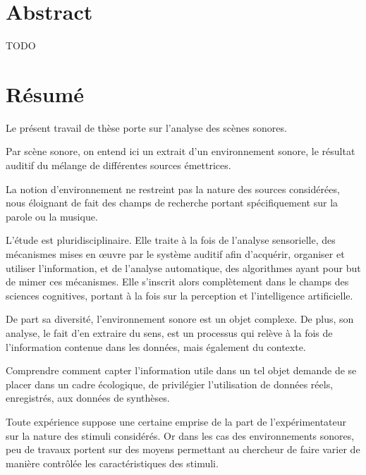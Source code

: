 \begingroup
\let\clearpage\relax
\let\cleardoublepage\relax
\let\cleardoublepage\relax

\chapter*{Abstract}
TODO

\vfill


\chapter*{Résumé}

Le présent travail de thèse porte sur l'analyse des scènes sonores. 

Par scène sonore, on entend ici un extrait d'un environnement sonore, le résultat auditif du mélange de différentes sources émettrices. 

La notion d'environnement ne restreint pas la nature des sources considérées, nous éloignant de fait des champs de recherche portant spécifiquement sur la parole ou la musique. 

L'étude est pluridisciplinaire. Elle traite à la fois de l'analyse sensorielle, des mécanismes mises en œuvre par le système auditif afin d'acquérir, organiser et utiliser l'information, et de l'analyse automatique, des algorithmes ayant pour but de mimer ces mécanismes. Elle s'inscrit alors complètement dans le champs des sciences cognitives, portant à la fois sur la perception et l'intelligence artificielle. 

De part sa diversité, l'environnement sonore est un objet complexe. De plus, son analyse, le fait d'en extraire du sens, est un processus qui relève à la fois de l'information contenue dans les données, mais également du contexte. 

Comprendre comment capter l'information utile dans un tel objet demande de se placer dans un cadre écologique, de privilégier l'utilisation de données réels, enregistrés, aux données de synthèses. 

Toute expérience suppose une certaine emprise de la part de l'expérimentateur sur la nature des stimuli considérés. Or dans les cas des environnements sonores, peu de travaux portent sur des moyens permettant au chercheur de faire varier de manière contrôlée les caractéristiques des stimuli.

